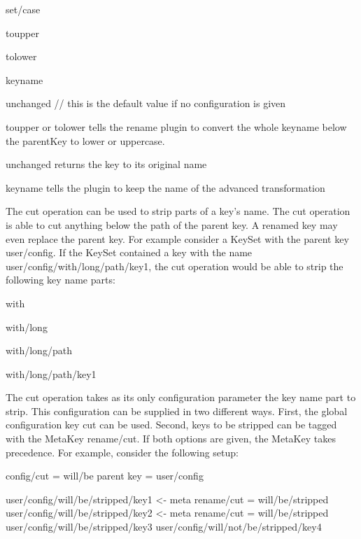 {\ttfamily set/case}


\begin{DoxyItemize}
\item toupper
\item tolower
\item keyname
\item unchanged // this is the default value if no configuration is given
\end{DoxyItemize}

{\ttfamily toupper} or {\ttfamily tolower} tells the rename plugin to convert the whole keyname below the parent\+Key to lower or uppercase.

{\ttfamily unchanged} returns the key to its original name

{\ttfamily keyname} tells the plugin to keep the name of the advanced transformation

The cut operation can be used to strip parts of a key’s name. The cut operation is able to cut anything below the path of the parent key. A renamed key may even replace the parent key. For example consider a Key\+Set with the parent key {\ttfamily user/config}. If the Key\+Set contained a key with the name {\ttfamily user/config/with/long/path/key1}, the cut operation would be able to strip the following key name parts\+:


\begin{DoxyItemize}
\item with
\item with/long
\item with/long/path
\item with/long/path/key1
\end{DoxyItemize}

The cut operation takes as its only configuration parameter the key name part to strip. This configuration can be supplied in two different ways. First, the global configuration key {\ttfamily cut} can be used. Second, keys to be stripped can be tagged with the Meta\+Key {\ttfamily rename/cut}. If both options are given, the Meta\+Key takes precedence. For example, consider the following setup\+:


\begin{DoxyCode}
config/cut = will/be
parent key = user/config

user/config/will/be/stripped/key1               <- meta rename/cut = will/be/stripped
user/config/will/be/stripped/key2               <- meta rename/cut = will/be/stripped
user/config/will/be/stripped/key3
user/config/will/not/be/stripped/key4
\end{DoxyCode}


